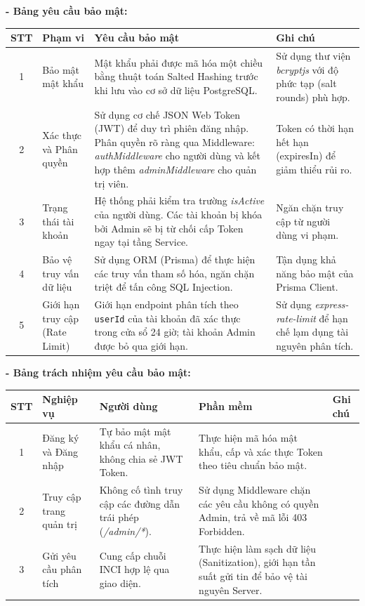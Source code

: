\documentclass[12pt,a4paper]{article}
\begin{document}
\textbf{- Bảng yêu cầu bảo mật:}

\begin{center}
\begin{tabular}{|c|p{3cm}|p{5.5cm}|p{3.5cm}|}
\hline
\textbf{STT} & \textbf{Phạm vi} & \textbf{Yêu cầu bảo mật} & \textbf{Ghi chú} \\
\hline
1 & Bảo mật mật khẩu & Mật khẩu phải được mã hóa một chiều bằng thuật toán Salted Hashing trước khi lưu vào cơ sở dữ liệu PostgreSQL. & Sử dụng thư viện \textit{bcryptjs} với độ phức tạp (salt rounds) phù hợp. \\
\hline
2 & Xác thực và Phân quyền & Sử dụng cơ chế JSON Web Token (JWT) để duy trì phiên đăng nhập. Phân quyền rõ ràng qua Middleware: \textit{authMiddleware} cho người dùng và kết hợp thêm \textit{adminMiddleware} cho quản trị viên. & Token có thời hạn hết hạn (expiresIn) để giảm thiểu rủi ro. \\
\hline
3 & Trạng thái tài khoản & Hệ thống phải kiểm tra trường \textit{isActive} của người dùng. Các tài khoản bị khóa bởi Admin sẽ bị từ chối cấp Token ngay tại tầng Service. & Ngăn chặn truy cập từ người dùng vi phạm. \\
\hline
4 & Bảo vệ truy vấn dữ liệu & Sử dụng ORM (Prisma) để thực hiện các truy vấn tham số hóa, ngăn chặn triệt để tấn công SQL Injection. & Tận dụng khả năng bảo mật của Prisma Client. \\
\hline
5 & Giới hạn truy cập (Rate Limit) & Giới hạn endpoint phân tích theo \texttt{userId} của tài khoản đã xác thực trong cửa sổ 24 giờ; tài khoản Admin được bỏ qua giới hạn. & Sử dụng \textit{express-rate-limit} để hạn chế lạm dụng tài nguyên phân tích. \\
\hline
\end{tabular}
\end{center}

\textbf{- Bảng trách nhiệm yêu cầu bảo mật:}

\begin{center}
\begin{tabular}{|c|p{3.5cm}|p{3.5cm}|p{4.5cm}|p{2cm}|}
\hline
\textbf{STT} & \textbf{Nghiệp vụ} & \textbf{Người dùng} & \textbf{Phần mềm} & \textbf{Ghi chú} \\
\hline
1 & Đăng ký và Đăng nhập & Tự bảo mật mật khẩu cá nhân, không chia sẻ JWT Token. & Thực hiện mã hóa mật khẩu, cấp và xác thực Token theo tiêu chuẩn bảo mật. & \\
\hline
2 & Truy cập trang quản trị & Không cố tình truy cập các đường dẫn trái phép (\textit{/admin/*}). & Sử dụng Middleware chặn các yêu cầu không có quyền Admin, trả về mã lỗi 403 Forbidden. & \\
\hline
3 & Gửi yêu cầu phân tích & Cung cấp chuỗi INCI hợp lệ qua giao diện. & Thực hiện làm sạch dữ liệu (Sanitization), giới hạn tần suất gửi tin để bảo vệ tài nguyên Server. & \\
\hline
\end{tabular}
\end{center}
\end{document}
